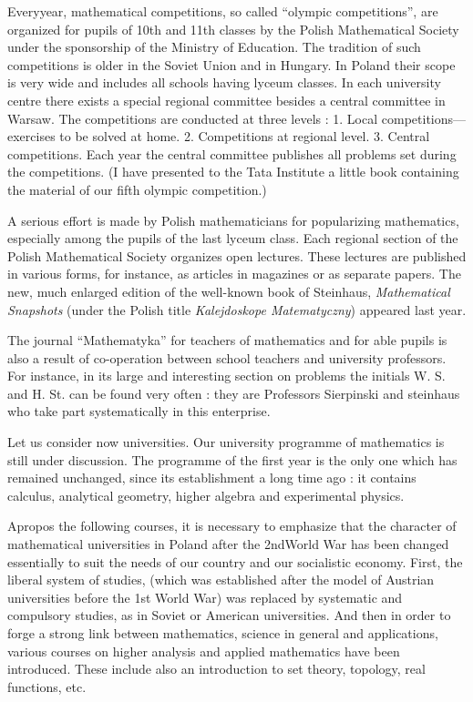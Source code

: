 Every\pageoriginale year, mathematical competitions, so called ``olympic competitions'', are organized for pupils of 10th and 11th classes by the Polish Mathematical Society under the sponsorship of the Ministry of Education. The tradition of such competitions is older in the Soviet Union and in Hungary. In Poland their scope is very wide and includes all schools having lyceum classes. In each university centre there exists a special regional committee besides a central committee in Warsaw. The competitions are conducted at three levels : 1. Local competitions---exercises to be solved at home. 2. Competitions at regional level. 3. Central competitions. Each year the central committee publishes all problems set during the competitions. (I have presented to the Tata Institute a little book containing the material of our fifth olympic competition.)

A serious effort is made by Polish mathematicians for popularizing mathematics, especially among the pupils of the last lyceum class. Each regional section of the Polish Mathematical Society organizes open lectures. These lectures are published in various forms, for instance, as articles in magazines or as separate papers. The new, much enlarged edition of the well-known book of Steinhaus, {\em Mathematical Snapshots} (under the Polish title {\em Kalejdoskope Matematyczny}) appeared last year.

The journal ``Mathematyka'' for teachers of mathematics and for able pupils is also a result of co-operation between school teachers and university professors. For instance, in its large and interesting section on problems the initials W. S. and H. St. can be found very often : they are Professors Sierpinski and steinhaus who take part systematically in this enterprise.

Let us consider now universities. Our university programme of mathematics is still under discussion. The programme of the first year is the only one which has remained unchanged, since its establishment a long time ago : it contains calculus, analytical geometry, higher algebra and experimental physics.

Apropos the following courses, it is necessary to emphasize that the character of mathematical universities in Poland after the 2nd\pageoriginale World War has been changed essentially to suit the needs of our country and our socialistic economy. First, the liberal system of studies, (which was established after the model of Austrian universities before the 1st World War) was replaced by systematic and compulsory studies, as in Soviet or American universities. And then in order to forge a strong link between mathematics, science in general and applications, various courses on higher analysis and applied mathematics have been introduced. These include also an introduction to set theory, topology, real functions, etc.

